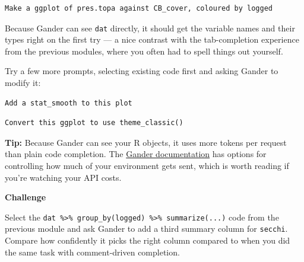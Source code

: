 \documentclass[
  letterpaper,
  DIV=11,
  numbers=noendperiod]{scrreprt}
\begin{document}
\begin{verbatim}
Make a ggplot of pres.topa against CB_cover, coloured by logged
\end{verbatim}

Because Gander can see \texttt{dat} directly, it should get the variable
names and their types right on the first try --- a nice contrast with
the tab-completion experience from the previous modules, where you often
had to spell things out yourself.

Try a few more prompts, selecting existing code first and asking Gander
to modify it:

\begin{verbatim}
Add a stat_smooth to this plot
\end{verbatim}

\begin{verbatim}
Convert this ggplot to use theme_classic()
\end{verbatim}

\textbf{Tip:} Because Gander can see your R objects, it uses more tokens
per request than plain code completion. The
\href{https://simonpcouch.github.io/gander/articles/gander.html}{Gander
documentation} has options for controlling how much of your environment
gets sent, which is worth reading if you're watching your API costs.

\begin{tcolorbox}[enhanced jigsaw, toprule=.15mm, rightrule=.15mm, left=2mm, leftrule=.75mm, breakable, opacityback=0, arc=.35mm, colframe=quarto-callout-important-color-frame, bottomrule=.15mm, colback=white]
\begin{minipage}[t]{5.5mm}
\textcolor{quarto-callout-important-color}{\faExclamation}
\end{minipage}%
\begin{minipage}[t]{\textwidth - 5.5mm}

\vspace{-3mm}\textbf{Challenge}\vspace{3mm}

Select the
\texttt{dat\ \%\textgreater{}\%\ group\_by(logged)\ \%\textgreater{}\%\ summarize(...)}
code from the previous module and ask Gander to add a third summary
column for \texttt{secchi}. Compare how confidently it picks the right
column compared to when you did the same task with comment-driven
completion.

\end{minipage}%
\end{tcolorbox}
\end{document}

